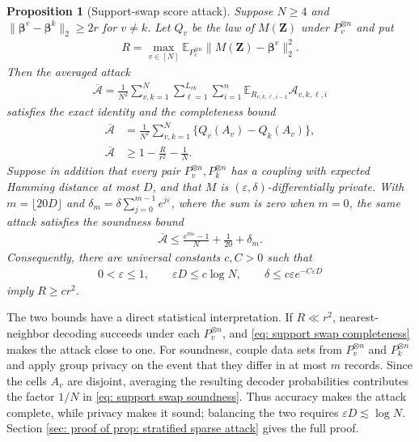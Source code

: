 \documentclass[letterpaper,12pt]{article}
\numberwithin{equation}{section}
\theoremstyle{plain}
\numberwithin{Theorem}{section}
\newtheorem{proposition}{Proposition}
\numberwithin{proposition}{section}
\numberwithin{Lemma}{section}
{
	\theoremstyle{definition}
	\newtheorem{Definition}{Definition}
	\newtheorem{example}{Example}
	\numberwithin{example}{section}
	\newtheorem{fact}{Fact}
	\numberwithin{fact}{section}
	\newtheorem{remark}{Remark}
}
\newcommand{\A}{\mathcal{A}}
\newcommand{\1}{\mathbbm{1}}
\def\bbeta{{\boldsymbol{\beta}}}
\def\E{\mathbb{E}}
\begin{document}
\begin{proposition}[Support-swap score attack]\label{prop: stratified sparse attack}
	Suppose $N\geq4$ and $\|\bbeta^v-\bbeta^k\|_2\geq2r$ for $v\neq k$.  Let $Q_v$ be the law of $M(\bm Z)$ under $P_v^{\otimes n}$ and put
	\begin{align*}
		R=\max_{v\in[N]}\E_{P_v^{\otimes n}}
		\|M(\bm Z)-\bbeta^v\|_2^2.
	\end{align*}
	Then the averaged attack
	\begin{align*}
		\overline{\A}
		=\frac1{N^2}\sum_{v,k=1}^N
		\sum_{\ell=1}^{L_{vk}}\sum_{i=1}^n
		\E_{R_{v,k,\ell,i-1}}\A_{v,k,\ell,i}
	\end{align*}
	satisfies the exact identity and the completeness bound
	\begin{align}
		\overline{\A}
		&=\frac1{N^2}\sum_{v,k=1}^N\{Q_v(A_v)-Q_k(A_v)\},       \label{eq: support swap telescope}\\
		\overline{\A}
		&\geq1-\frac{R}{r^2}-\frac1N.                          \label{eq: support swap completeness}
	\end{align}
	Suppose in addition that every pair $P_v^{\otimes n},P_k^{\otimes n}$ has a coupling with expected Hamming distance at most $D$, and that $M$ is $(\varepsilon,\delta)$-differentially private.  With $m=\lfloor20D\rfloor$ and
	$\delta_m=\delta\sum_{j=0}^{m-1}e^{j\varepsilon}$, where the sum is zero when $m=0$, the same attack satisfies the soundness bound
	\begin{align}
		\overline{\A}
		\leq\frac{e^{m\varepsilon}-1}{N}+\frac1{20}+\delta_m.  \label{eq: support swap soundness}
	\end{align}
	Consequently, there are universal constants $c,C>0$ such that
	\begin{align*}
		0<\varepsilon\leq1,\qquad
		\varepsilon D\leq c\log N,\qquad
		\delta\leq c\varepsilon e^{-C\varepsilon D}
	\end{align*}
	imply $R\geq cr^2$.
\end{proposition}

The two bounds have a direct statistical interpretation.  If $R\ll r^2$, nearest-neighbor decoding succeeds under each $P_v^{\otimes n}$, and \eqref{eq: support swap completeness} makes the attack close to one.  For soundness, couple data sets from $P_v^{\otimes n}$ and $P_k^{\otimes n}$ and apply group privacy on the event that they differ in at most $m$ records.  Since the cells $A_v$ are disjoint, averaging the resulting decoder probabilities contributes the factor $1/N$ in \eqref{eq: support swap soundness}.  Thus accuracy makes the attack complete, while privacy makes it sound; balancing the two requires $\varepsilon D\lesssim\log N$.  Section \ref{sec: proof of prop: stratified sparse attack} gives the full proof.
\end{document}
